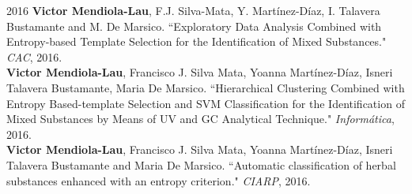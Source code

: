 \documentclass[]{friggeri-cv}
\begin{document}
\begin{entrylist}    
  \entry
    {2016}
    {}
    {}
    {
		\textbf{Victor Mendiola-Lau}, F.J. Silva-Mata, Y. Martínez-Díaz, I. Talavera Bustamante and M. De Marsico. ``Exploratory Data Analysis Combined with Entropy-based Template Selection for the Identification of Mixed Substances."	 \emph{CAC}, 2016.\\
	
		\textbf{Victor Mendiola-Lau}, Francisco J. Silva Mata, Yoanna Martínez-Díaz, Isneri Talavera Bustamante, Maria De Marsico. ``Hierarchical Clustering Combined with Entropy Based-template Selection and SVM Classification for the Identification of Mixed Substances by Means of UV and GC Analytical Technique." \emph{Informática}, 2016.\\	
	
		\textbf{Victor Mendiola-Lau}, Francisco J. Silva Mata, Yoanna Martínez-Díaz, Isneri Talavera Bustamante and Maria De Marsico. ``Automatic classification of herbal substances enhanced with an entropy criterion." \emph{CIARP}, 2016.  
    }
\end{entrylist}
\end{document}
